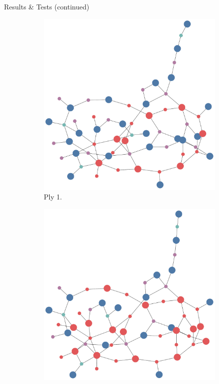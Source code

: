 \documentclass[final]{beamer} %
\begin{document}
\begin{frame}
\begin{columns}
\begin{column}{.35\textwidth}
{\begin{block}{Results \& Tests (continued)}
					\begin{figure}[!htb]
						\centering
						\begin{subfigure}[!htb]{0.24\columnwidth}
							\centering
							\includegraphics[width=\columnwidth]{figures/knn_backward_think_1.pdf}
							\caption{Ply 1.}
						\end{subfigure}
						\begin{subfigure}[!htb]{0.24\columnwidth}
							\centering
							\includegraphics[width=\columnwidth]{figures/knn_backward_think_2.pdf}

\end{subfigure}
\end{figure}
\end{block}}
\end{column}
\end{columns}
\end{frame}
\end{document}
